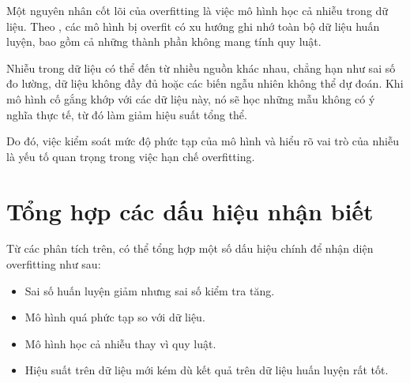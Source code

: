 Một nguyên nhân cốt lõi của overfitting là việc mô hình học cả nhiễu trong dữ liệu. Theo \cite{Ying2019}, các mô hình bị overfit có xu hướng ghi nhớ toàn bộ dữ liệu huấn luyện, bao gồm cả những thành phần không mang tính quy luật.

Nhiễu trong dữ liệu có thể đến từ nhiều nguồn khác nhau, chẳng hạn như sai số đo lường, dữ liệu không đầy đủ hoặc các biến ngẫu nhiên không thể dự đoán. Khi mô hình cố gắng khớp với các dữ liệu này, nó sẽ học những mẫu không có ý nghĩa thực tế, từ đó làm giảm hiệu suất tổng thể.

Do đó, việc kiểm soát mức độ phức tạp của mô hình và hiểu rõ vai trò của nhiễu là yếu tố quan trọng trong việc hạn chế overfitting.

\section{Tổng hợp các dấu hiệu nhận biết}

Từ các phân tích trên, có thể tổng hợp một số dấu hiệu chính để nhận diện overfitting như sau:
\begin{itemize}
    \item Sai số huấn luyện giảm nhưng sai số kiểm tra tăng.
    \item Mô hình quá phức tạp so với dữ liệu.
    \item Mô hình học cả nhiễu thay vì quy luật.
    \item Hiệu suất trên dữ liệu mới kém dù kết quả trên dữ liệu huấn luyện rất tốt.
\end{itemize}